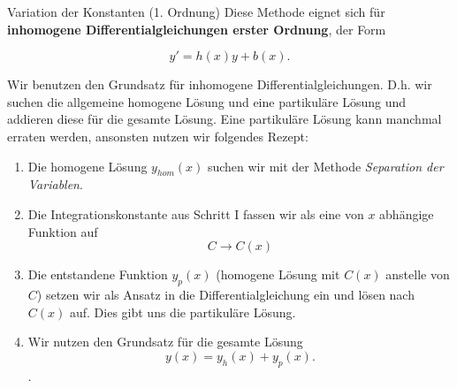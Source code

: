 \begin{Rezept}{Variation der Konstanten (1. Ordnung)}{}
	Diese Methode eignet sich für \textbf{inhomogene Differentialgleichungen erster Ordnung}, der Form
	
	\begin{equation*}
	y' = h(x) y + b(x).
	\end{equation*}
	
	Wir benutzen den Grundsatz für inhomogene Differentialgleichungen. D.h. wir suchen die allgemeine homogene Lösung und eine partikuläre Lösung und addieren diese für die gesamte Lösung. Eine partikuläre Lösung kann manchmal erraten werden, ansonsten nutzen wir folgendes Rezept:
	
	\begin{enumerate}
		\item Die homogene Lösung $y_{hom}(x)$ suchen wir mit der Methode \textit{Separation der Variablen}.
		\item Die Integrationskonstante aus Schritt I fassen wir als eine von $x$ abhängige Funktion auf
		\begin{equation*}
		C \rightarrow C(x)
		\end{equation*}
		\item Die entstandene Funktion $y_p(x)$ (homogene Lösung mit $C(x)$ anstelle von $C$) setzen wir als Ansatz in die Differentialgleichung ein und lösen nach $C(x)$ auf. Dies gibt uns die partikuläre Lösung.
		\item  Wir nutzen den Grundsatz für die gesamte Lösung
		\begin{equation*}
		y(x) = y_h(x) + y_p(x).
		\end{equation*}.
	\end{enumerate}
\end{Rezept}

